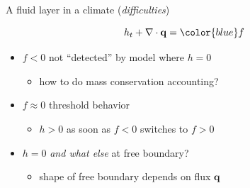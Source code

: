 \documentclass{beamer}
\newcommand\bq{\mathbf{q}}
\newcommand{\Div}{\nabla\cdot}
\begin{document}
\begin{frame}{A fluid layer in a climate (\emph{difficulties})}

\begin{center}
\end{center}

\vspace{-18mm}
$$h_t + \Div\bq = {\color{blue} f}$$

  \begin{itemize}
  \item<1-> $f<0$ not ``detected'' by model where $h=0$
     \begin{itemize}
     \item<1->[$\circ$] how to do mass conservation accounting?
     \end{itemize}
  \item<2-> $f\approx 0$ threshold behavior
     \begin{itemize}
     \item<2->[$\circ$] $h>0$ as soon as $f<0$ switches to $f>0$
     \end{itemize}
  \item<3> $h=0$ \emph{and what else} at free boundary?
     \begin{itemize}
     \item<3>[$\circ$] shape of free boundary depends on flux $\bq$
     \end{itemize}
  \end{itemize}
\end{frame}
\end{document}

